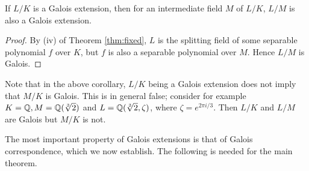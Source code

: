 \begin{corollary} \label{thm:galois-intermediate}
	If $L/K$ is a Galois extension, then for an intermediate field $M$ of $L/K$, $L/M$ is also a Galois extension. 
\end{corollary}
\begin{proof}
	By (iv) of Theorem \ref{thm:fixed}, $L$ is the splitting field of some separable polynomial $f$ over $K$, but $f$ is also a separable polynomial over $M$. Hence $L/M$ is Galois.
\end{proof}

\begin{example}
	Note that in the above corollary, $L/K$ being a Galois extension does not imply that $M/K$ is Galois. This is in general false; consider for example $K = \mathbb Q, M = \mathbb Q(\sqrt[3]{2})$ and $L = \mathbb Q(\sqrt[3]{2}, \zeta)$, where $\zeta = e^{2\pi i / 3}$. Then $L/K$ and $L/M$ are Galois but $M/K$ is not. 
\end{example}

The most important property of Galois extensions is that of Galois correspondence, which we now establish. The following is needed for the main theorem. 


%





%
%
%

